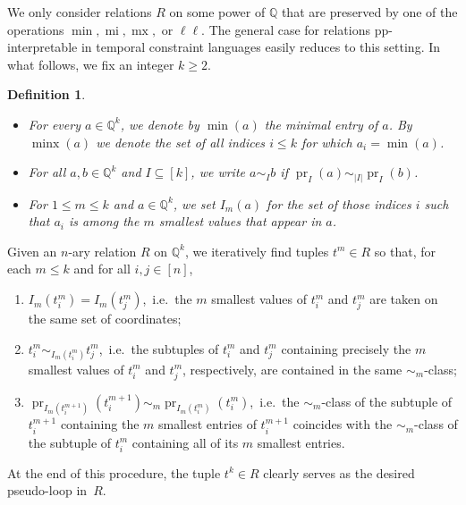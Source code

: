 \documentclass[a4paper,reqno, cleveref]{amsart}
\newtheorem{definition}[theorem]{Definition}
\newcommand{\Q}{\mathbb{Q}}
\newcommand{\br}[1]{[#1]}
\newcommand{\acts}{\curvearrowright}
\newcommand{\tup}{t}
\DeclareMathOperator{\pr}{pr}
\DeclareMathOperator{\Aut}{Aut}
\DeclareMathOperator{\mx}{mx}
\DeclareMathOperator{\mi}{mi}
\DeclareMathOperator{\minx}{minx}
\newcommand{\johanna}[1]{\todo{\textbf{Johanna:} #1}}
\begin{document}
We only consider relations $R$ on some power of $\Q$ that are preserved by one of the operations $\min, \mi, \mx,$ or $\ell \ell$. The general case for relations pp-interpretable in temporal constraint languages  easily reduces to this setting. %
In what follows, we fix an integer $k \geq 2$. 

\begin{definition}
    \begin{itemize}
        \item For every $a \in \Q^k$, we denote by $\min(a)$  the minimal entry 
    of $a$. By $\minx(a)$ we denote the set of all indices $i \leq k$ for which $a_i=\min(a) $.
    \item For all $a,b \in \Q^k$ and $I\subseteq \br k$, we write $a\sim_I b$ if  $\pr_I(a)\sim_{|I|} \pr_I(b)$.
        \item For $1\leq m\leq k$ and $a\in \Q^k$, we set $I_m(a)$ for the set of those indices $i$ such that $a_i$ is among the $m$ smallest values that appear in $a$.
   \end{itemize}
   \end{definition}

 Given an $n$-ary relation $R$ on $\Q^k$,  we iteratively find tuples  $\tup^m \in R$ so that, for each $m\leq k$ and for all $i,j \in \br n$, \begin{enumerate}   
 \item\label{item:smallest_same_coords} $I_m(\tup_i^m)=I_m(\tup_j^m)$,~i.e.~the $m$ smallest values of  $\tup_i^m$ and $\tup_j^m$ are taken on the same set of coordinates;
 \item\label{item:smallest_same_orbit} $\tup^m_i\sim_{I_m(\tup^m_i)} \tup^m_j$,~i.e.~the subtuples  of $\tup^m_i$ and $\tup^m_j$ containing precisely the $m$ smallest values of  $\tup^m_i$ and $\tup^m_j$, respectively,   are contained in the same $\sim_m$-class; 
 \item\label{item:smallest_m+1} $\pr_{I_m(\tup^{m+1}_i )} (\tup^{m+1}_i ) \sim_{m} \pr_{I_m(\tup^{m}_i )}( \tup^{m}_i)$,~i.e.~the $\sim_m$-class of the subtuple of $\tup^{m+1}_i$  containing the $m$ smallest entries of $\tup^{m+1}_i$  coincides with  the  $\sim_m$-class of the subtuple of $\tup^{m}_i$ containing all of its  $m$ smallest entries.
\end{enumerate}    %
At the end of this procedure, the tuple $\tup^k\in R$ clearly serves as the desired pseudo-loop in~$R$.
\end{document}
